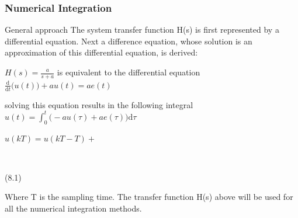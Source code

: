\begin{frame}
	\frametitle{Numerical Integration}
	\begin{block}{General approach}
		The system transfer function H(s) is first represented by a differential equation. Next a difference equation, whose solution is an approximation of this differential equation, is derived: 
		\vspace{-0.8em}
		\begin{center}
			$H(s) = \frac{a}{s + a}$
			is equivalent to the differential equation
			$\frac{\mathrm d}{\mathrm d t} \big( u(t) \big) + au(t) = ae(t)$
			
			solving this equation results in the following integral
			$u(t) = \int_0^t \big(-au(\tau) + ae(\tau) \big)\mathrm{d}\tau$
			
			$u(kT) = u(kT - T)+ $ 
			\begin{cases}
				\\
			\end{cases}
			(8.1)
		\end{center}
		\vspace{-0.8em}
		Where T is the sampling time. The transfer function H(s) above will be used for all the numerical integration methods.
	\end{block}
\end{frame}

